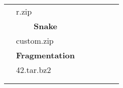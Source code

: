 \documentclass{article}           %
\begin{document}
\begin{table}[]
\begin{tabular}{llllllll}
\multicolumn{1}{|l|}{}                               & \multicolumn{2}{l|}{r.zip}                                                  & \multicolumn{1}{l|}{}       & \multicolumn{1}{l|}{}       & \multicolumn{1}{l|}{}           & \multicolumn{1}{l|}{}      & \multicolumn{1}{l|}{}        \\ \cline{2-8} 
\multicolumn{1}{|l|}{}                               & \multicolumn{2}{c|}{\textbf{Snake}}                                         & \multicolumn{5}{l|}{}                                                                                                                                   \\ \cline{2-8} 
\multicolumn{1}{|l|}{}                               & \multicolumn{2}{l|}{custom.zip}                                             & \multicolumn{1}{l|}{}       & \multicolumn{1}{l|}{}       & \multicolumn{1}{l|}{}           & \multicolumn{1}{l|}{}      & \multicolumn{1}{l|}{}        \\ \cline{2-8} 
\multicolumn{1}{|l|}{}                               & \multicolumn{2}{c|}{\textbf{Fragmentation}}                                 & \multicolumn{1}{l|}{}       & \multicolumn{1}{l|}{}       & \multicolumn{1}{l|}{}           & \multicolumn{1}{l|}{}      & \multicolumn{1}{l|}{}        \\ \cline{2-8} 
\multicolumn{1}{|l|}{}                               & \multicolumn{2}{l|}{42.tar.bz2}                                             & \multicolumn{1}{l|}{}       & \multicolumn{1}{l|}{}       & \multicolumn{1}{l|}{}           & \multicolumn{1}{l|}{}      & \multicolumn{1}{l|}{}        \\ \hline
                                                     &                                               &                             &                             &                             &                                 &                            &                              \\
                                                     &                                               &                             &                             &                             &                                 &                            &                             
\end{tabular}
\end{table}
\end{document}
